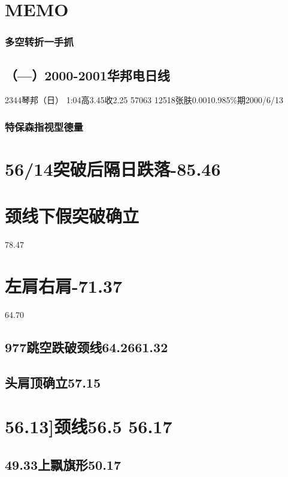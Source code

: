 \documentclass{article}
\begin{document}
\section{MEMO}

\clearpage

\subsubsection{多空转折一手抓}

\subsection{（—）2000-2001华邦电日线}

2344琴邦（日） 1:04高3.45收2.25 57063 12518张肤0.0010.985\%期2000/6/13

\subsubsection{特保森指视型德量}

\section{56/14突破后隔日跌落-85.46}

\section{颈线下假突破确立}

78.47

\section{左肩右肩-71.37}

64.70

\subsection{977跳空跌破颈线64.2661.32}

\subsection{头肩顶确立57.15}

\section{56.13]颈线56.5 56.17}

\subsection{49.33上飘旗形50.17}
\end{document}
